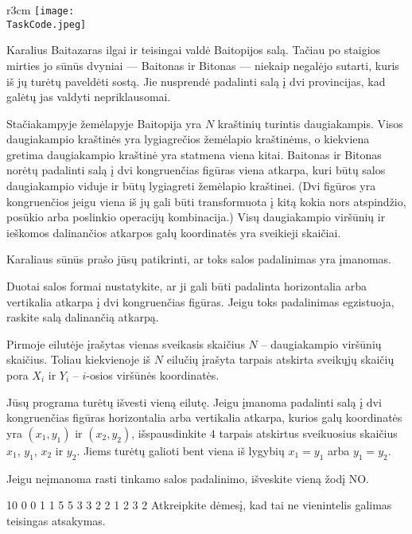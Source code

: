 \documentclass{boi2014-lt}
\renewcommand{\TaskCode}{demarcation}
\begin{document}
    \begin{wrapfigure}{r}{3cm}
        \vspace{-24pt}
		\texttt{[image: \\TaskCode.jpeg]}
	\end{wrapfigure}

    Karalius Baitazaras ilgai ir teisingai valdė Baitopijos salą. Tačiau po
    staigios mirties jo sūnūs dvyniai --- Baitonas ir Bitonas --- niekaip
    negalėjo sutarti, kuris iš jų turėtų paveldėti sostą. Jie nusprendė
    padalinti salą į dvi provincijas, kad galėtų jas valdyti nepriklausomai.
 
    Stačiakampyje žemėlapyje Baitopija yra $N$ kraštinių turintis daugiakampis.
    Visos daugiakampio kraštinės yra lygiagrečios žemėlapio kraštinėms, o
    kiekviena gretima daugiakampio kraštinė yra statmena viena kitai. Baitonas ir
    Bitonas norėtų padalinti salą į dvi kongruenčias figūras viena atkarpa, kuri
    būtų salos daugiakampio viduje ir būtų lygiagreti žemėlapio kraštinei. (Dvi
    figūros yra kongruenčios jeigu viena iš jų gali būti transformuota į kitą
    kokia nors atspindžio, posūkio arba poslinkio operacijų kombinacija.) Visų
    daugiakampio viršūnių ir ieškomos dalinančios atkarpos galų koordinatės yra
    sveikieji skaičiai.
 
    Karaliaus sūnūs prašo jūsų patikrinti, ar toks salos padalinimas yra
    įmanomas.

    \Task
    Duotai salos formai nustatykite, ar ji gali būti padalinta horizontalia arba
    vertikalia atkarpa į dvi kongruenčias figūras. Jeigu toks padalinimas
    egzistuoja, raskite salą dalinančią atkarpą.

    \Input
    Pirmoje eilutėje įrašytas vienas sveikasis skaičius $N$ -- daugiakampio
    viršūnių skaičius. Toliau kiekvienoje iš $N$ eilučių įrašyta tarpais atskirta
    sveikųjų skaičių pora $X_i$ ir $Y_i$ -- $i$-osios viršūnės koordinatės.

    \Output
    Jūsų programa turėtų išvesti vieną eilutę. Jeigu įmanoma padalinti salą į dvi
    kongruenčias figūras horizontalia arba vertikalia atkarpa, kurios galų
    koordinatės yra $(x_1, y_1)$ ir $(x_2, y_2)$, išspausdinkite $4$ tarpais
    atskirtus sveikuosius skaičius $x_1$, $y_1$, $x_2$ ir $y_2$. Jiems turėtų
    galioti bent viena iš lygybių $x_1 = y_1$ arba $y_1 = y_2$.

    Jeigu neįmanoma rasti tinkamo salos padalinimo, išveskite vieną žodį NO.

    \Examples
	\example
	{
		10  0  0  1  1  5  5  3  3  2  2
	}
	{
		1 2 3 2
	}
	{
		Atkreipkite dėmesį, kad tai ne vienintelis galimas teisingas atsakymas.
	}
\end{document}
